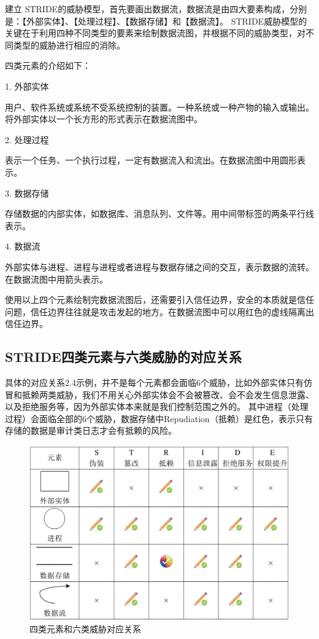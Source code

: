 建立 STRIDE的威胁模型，首先要画出数据流，数据流是由四大要素构成，分别是：【外部实体】、【处理过程】、【数据存储】和【数据流】。
STRIDE威胁模型的关键在于利用四种不同类型的要素来绘制数据流图，并根据不同的威胁类型，对不同类型的威胁进行相应的消除。


四类元素的介绍如下：

1.  外部实体

用户、软件系统或系统不受系统控制的装置。一种系统或一种产物的输入或输出。将外部实体以一个长方形的形式表示在数据流图中。

2.  处理过程

表示一个任务、一个执行过程，一定有数据流入和流出。在数据流图中用圆形表示。

3.  数据存储

存储数据的内部实体，如数据库、消息队列、文件等。用中间带标签的两条平行线表示。

4.  数据流

外部实体与进程、进程与进程或者进程与数据存储之间的交互，表示数据的流转。在数据流图中用箭头表示。

使用以上四个元素绘制完数据流图后，还需要引入信任边界，安全的本质就是信任问题，信任边界往往就是攻击发起的地方。在数据流图中可以用红色的虚线隔离出信任边界。



\subsection{STRIDE四类元素与六类威胁的对应关系}

具体的对应关系2.4示例，并不是每个元素都会面临6个威胁，比如外部实体只有仿冒和抵赖两类威胁，我们不用关心外部实体会不会被篡改、会不会发生信息泄露、以及拒绝服务等，因为外部实体本来就是我们控制范围之外的。
其中进程（处理过程）会面临全部的6个威胁，数据存储中Repudiation（抵赖）是红色，表示只有存储的数据是审计类日志才会有抵赖的风险。
\begin{figure}
    \centering
    \includegraphics[scale=0.6]{resources/img/i77.png}
    \caption{四类元素和六类威胁对应关系}
  \end{figure}

